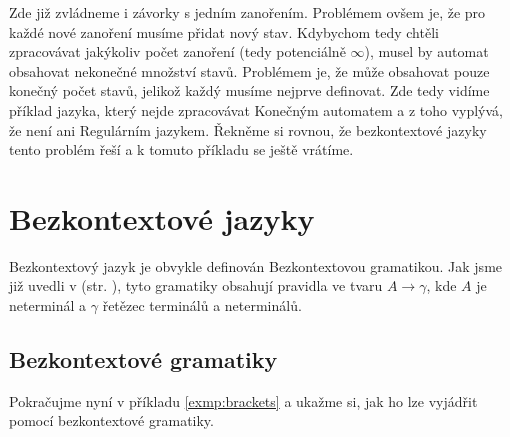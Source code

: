 \begin{exmp}
  Zde již zvládneme i závorky s jedním zanořením. Problémem ovšem je, že
  pro každé nové zanoření musíme přidat nový stav.
  Kdybychom tedy chtěli zpracovávat jakýkoliv počet zanoření (tedy potenciálně $\infty$),
  musel by automat obsahovat nekonečné množství stavů.
  Problémem  je, že může obsahovat pouze konečný
  počet stavů, jelikož každý musíme nejprve definovat.
  Zde tedy vidíme příklad jazyka, který nejde zpracovávat Konečným automatem
  a z toho vyplývá, že není ani Regulárním jazykem.
  Řekněme si rovnou, že bezkontextové jazyky tento problém řeší a k tomuto
  příkladu se ještě vrátíme.

\end{exmp}

\section{Bezkontextové jazyky}

Bezkontextový jazyk je obvykle definován Bezkontextovou gramatikou.
Jak jsme již uvedli v  (str. \pageref{subsec:chomHierarchy}),
tyto gramatiky obsahují pravidla ve tvaru $A \rightarrow \gamma$, kde $A$ je neterminál a
$\gamma$ řetězec terminálů a neterminálů.

\subsection{Bezkontextové gramatiky}
\label{subsec:contextFreeGrammars}
Pokračujme nyní v příkladu \ref{exmp:brackets} a ukažme si, jak ho lze
vyjádřit pomocí bezkontextové gramatiky.\\

